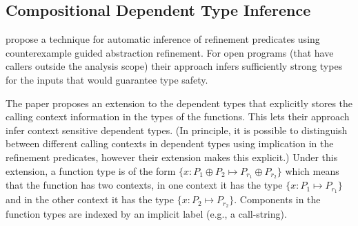 \newcommand{\ctx}{\oplus}
\subsection{Compositional Dependent Type Inference}

\cite{sujag:VMCAI13} propose a technique for automatic inference of refinement predicates 
using counterexample guided abstraction refinement. For open programs (that have
callers outside the analysis scope) their approach infers sufficiently strong types for the inputs 
that would guarantee type safety. 

The paper proposes an extension to the dependent types that
explicitly stores the calling context information in the types of the functions.
This lets their approach infer context sensitive dependent types.
(In principle, it is possible to distinguish between different calling contexts in dependent types 
using implication in the refinement predicates, however their extension makes this explicit.)
Under this extension, a function type is of the form $\{ x:P_1 \ctx P_2 \mapsto P_{r_1} \ctx P_{r_2}\}$ 
which means that the function has two contexts, in one context it has the type $\{x:P_1 \mapsto  P_{r_1} \}$ 
and in the other context it has the type $\{x:P_2 \mapsto  P_{r_2} \}$. Components in the function types
are indexed by an implicit label (e.g., a call-string).

